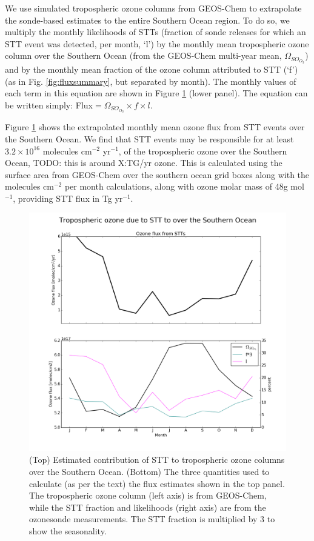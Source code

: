 \documentclass{article}
\begin{document}
  We use simulated tropospheric ozone columns from GEOS-Chem to extrapolate the sonde-based estimates to the entire Southern Ocean region. 
  To do so, we multiply the monthly likelihoods of STTs (fraction of sonde releases for which an STT event was detected, per month, `l') by the monthly mean tropospheric ozone column over the Southern Ocean (from the GEOS-Chem multi-year mean, $\Omega_{SO_{O_3}}$) and by the monthly mean fraction of the ozone column attributed to STT (`f') (as in Fig. \ref{fig:fluxsummary}, but separated by month).
  The monthly values of each term in this equation are shown in Figure \ref{fig:SOExtrapolation} (lower panel).
  The equation can be written simply: Flux$= \Omega_{SO_{O_3}} \times f \times l$.
  
  Figure \ref{fig:SOExtrapolation} shows the extrapolated monthly mean ozone flux from STT events over the Southern Ocean.
  We find that STT events may be responsible for at least $3.2 \times10^{16}$ molecules cm$^{-2}$ yr$^{-1}$, of the tropospheric ozone over the Southern Ocean, TODO: this is around X:TG/yr ozone.
  This is calculated using the surface area from GEOS-Chem over the southern ocean grid boxes along with the molecules cm$^{-2}$ per month calculations, along with ozone molar mass of 48g mol$^{-1}$, providing STT flux in Tg yr$^{-1}$.
    
  \begin{figure}[!htbp]
    \includegraphics[width=\textwidth]{figures/SO_extrapolation.png}
    \caption{(Top) Estimated contribution of STT to tropospheric ozone columns over the Southern Ocean.
      (Bottom) The three quantities used to calculate (as per the text) the flux estimates shown in the top panel.
      The tropospheric ozone column (left axis) is from GEOS-Chem, while the STT fraction and likelihoods (right axis) are from the ozonesonde measurements.
      The STT fraction is multiplied by 3 to show the seasonality.}
    \label{fig:SOExtrapolation}
  \end{figure}
  
\end{document}
